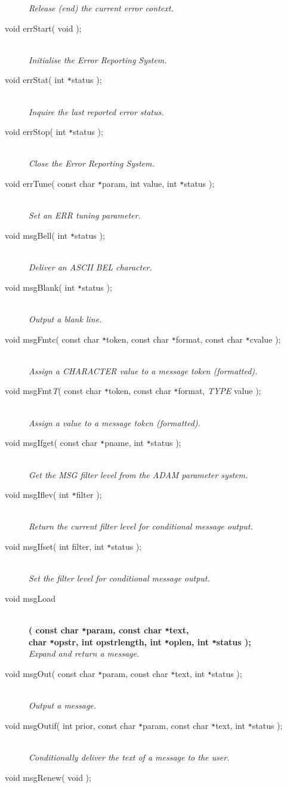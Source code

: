 \documentclass[twoside,11pt]{article}
\renewcommand{\_}{\texttt{\symbol{95}}}
\newcommand{\listline}{\hspace{1pt}\\}
\newcommand{\listline}{}
\begin{document}
\begin{description}
\textit{Release (end) the current error context.}
\item[void errStart( void );] \listline
\textit{Initialise the Error Reporting System.}
\item[void errStat( int \texttt{*}status );] \listline
\textit{Inquire the last reported error status.}
\item[void errStop( int \texttt{*}status );] \listline
\textit{Close the Error Reporting System.}
\item[void errTune( const char \texttt{*}param, int value, 
int \texttt{*}status );] \listline
\textit{Set an ERR tuning parameter.}
\item[void msgBell( int \texttt{*}status );] \listline
\textit{Deliver an ASCII BEL character.}
\item[void msgBlank( int \texttt{*}status );] \listline
\textit{Output a blank line.}
\item[void msgFmtc( const char \texttt{*}token, const char \texttt{*}format, 
const char \texttt{*}cvalue );] \listline
\textit{Assign a CHARACTER value to a message token (formatted).}
\item[void msgFmt\textit{T}( const char \texttt{*}token,
const char \texttt{*}format, \textit{TYPE} value );] \listline
\textit{Assign a value to a message token (formatted).}
\item[void msgIfget( const char \texttt{*}pname, int \texttt{*}status );] \listline
\textit{Get the MSG filter level from the ADAM parameter system.}
\item[void msgIflev( int \texttt{*}filter );] \listline
\textit{Return the current filter level for conditional message output.}
\item[void msgIfset( int filter, int \texttt{*}status );] \listline
\textit{Set the filter level for conditional message output.}
\item[void msgLoad] \listline
\textbf{( const char \texttt{*}param, const char \texttt{*}text, {\listline}
char \texttt{*}opstr, int opstr\_length, int \texttt{*}oplen,
int \texttt{*}status );}\\
\textit{Expand and return a message.}
\item[void msgOut( const char \texttt{*}param, const char \texttt{*}text, 
int \texttt{*}status );] \listline
\textit{Output a message.}
\item[void msgOutif( int prior, const char \texttt{*}param, 
const char \texttt{*}text, int \texttt{*}status );] \listline
\textit{Conditionally deliver the text of a message to the user.}
\item[void msgRenew( void );] \listline

\end{description}
\end{document}
